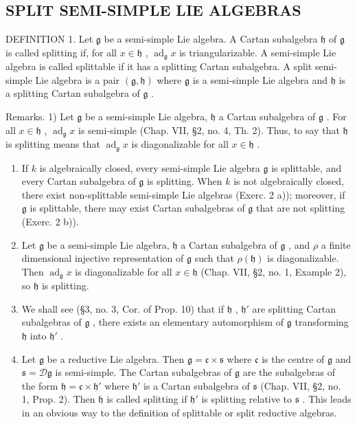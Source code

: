 \subsection{SPLIT SEMI-SIMPLE LIE ALGEBRAS}

DEFINITION 1. Let \(\mathfrak{g}\) be a semi-simple Lie algebra. A Cartan subalgebra \(\mathfrak{h}\) of \(\mathfrak{g}\) is called splitting if, for all \(x \in \mathfrak{h}\) , \(\operatorname{ad}_{\mathfrak{g}} x\) is triangularizable. A semi-simple Lie algebra is called splittable if it has a splitting Cartan subalgebra. A split semi-simple Lie algebra is a pair \((\mathfrak{g}, \mathfrak{h})\) where \(\mathfrak{g}\) is a semi-simple Lie algebra and \(\mathfrak{h}\) is a splitting Cartan subalgebra of \(\mathfrak{g}\) .

Remarks. 1) Let \(\mathfrak{g}\) be a semi-simple Lie algebra, \(\mathfrak{h}\) a Cartan subalgebra of \(\mathfrak{g}\) . For all \(x \in \mathfrak{h}\) , \(\operatorname{ad}_{\mathfrak{g}} x\) is semi-simple (Chap. VII, §2, no. 4, Th. 2). Thus, to say that \(\mathfrak{h}\) is splitting means that \(\operatorname{ad}_{\mathfrak{g}} x\) is diagonalizable for all \(x \in \mathfrak{h}\) .

\begin{enumerate}
\def\labelenumi{\arabic{enumi})}
\setcounter{enumi}{1}
\item
  If \(k\) is algebraically closed, every semi-simple Lie algebra \(\mathfrak{g}\) is splittable, and every Cartan subalgebra of \(\mathfrak{g}\) is splitting. When \(k\) is not algebraically closed, there exist non-splittable semi-simple Lie algebras (Exerc. 2 a)); moreover, if \(\mathfrak{g}\) is splittable, there may exist Cartan subalgebras of \(\mathfrak{g}\) that are not splitting (Exerc. 2 b)).
\item
  Let \(\mathfrak{g}\) be a semi-simple Lie algebra, \(\mathfrak{h}\) a Cartan subalgebra of \(\mathfrak{g}\) , and \(\rho\) a finite dimensional injective representation of \(\mathfrak{g}\) such that \(\rho(\mathfrak{h})\) is diagonalizable. Then \(\operatorname{ad}_{\mathfrak{g}}x\) is diagonalizable for all \(x \in \mathfrak{h}\) (Chap. VII, §2, no. 1, Example 2), so \(\mathfrak{h}\) is splitting.
\item
  We shall see (§3, no. 3, Cor. of Prop. 10) that if \(\mathfrak{h}\) , \(\mathfrak{h}'\) are splitting Cartan subalgebras of \(\mathfrak{g}\) , there exists an elementary automorphism of \(\mathfrak{g}\) transforming \(\mathfrak{h}\) into \(\mathfrak{h}'\) .
\item
  Let \(\mathfrak{g}\) be a reductive Lie algebra. Then \(\mathfrak{g} = \mathfrak{c} \times \mathfrak{s}\) where \(\mathfrak{c}\) is the centre of \(\mathfrak{g}\) and \(\mathfrak{s} = \mathcal{D}\mathfrak{g}\) is semi-simple. The Cartan subalgebras of \(\mathfrak{g}\) are the subalgebras of the form \(\mathfrak{h} = \mathfrak{c} \times \mathfrak{h}'\) where \(\mathfrak{h}'\) is a Cartan subalgebra of \(\mathfrak{s}\) (Chap. VII, §2, no. 1, Prop. 2). Then \(\mathfrak{h}\) is called splitting if \(\mathfrak{h}'\) is splitting relative to \(\mathfrak{s}\) . This leads in an obvious way to the definition of splittable or split reductive algebras.
\end{enumerate}
\relax{}
